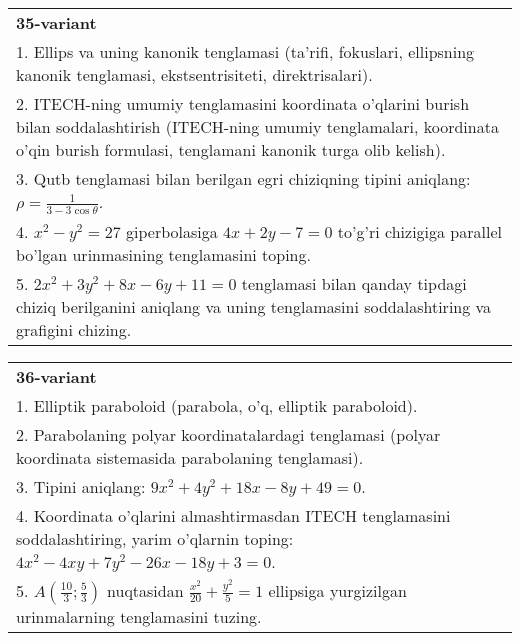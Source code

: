 \documentclass{article}
\begin{document}
\begin{tabular}{m{17cm}}
\textbf{35-variant}\\
1. Ellips va uning kanonik tenglamasi (ta'rifi, fokuslari, ellipsning kanonik tenglamasi, ekstsentrisiteti, direktrisalari).\\

2. ITECH-ning umumiy tenglamasini koordinata o'qlarini burish bilan soddalashtirish (ITECH-ning umumiy tenglamalari, koordinata o'qin burish formulasi, tenglamani kanonik turga olib kelish).\\

3. Qutb tenglamasi bilan berilgan egri chiziqning tipini aniqlang: $\rho=\frac{1}{3-3\cos\theta}$.\\

4. $x^{2} - y^{2} = 27$ giperbolasiga $4x + 2y - 7 = 0$ to'g'ri chizigiga parallel bo'lgan urinmasining tenglamasini toping.  \\

5. $2x^{2} + 3y^{2} + 8x - 6y + 11 = 0$ tenglamasi bilan qanday tipdagi chiziq berilganini aniqlang va uning tenglamasini soddalashtiring va grafigini chizing.  
\end{tabular}
\vspace{1cm}


\begin{tabular}{m{17cm}}
\textbf{36-variant}\\
1. Elliptik paraboloid (parabola, o'q, elliptik paraboloid).\\

2. Parabolaning polyar koordinatalardagi tenglamasi (polyar koordinata sistemasida parabolaning tenglamasi).\\

3. Tipini aniqlang: $9x^{2}+4y^{2}+18x-8y+49=0$.\\

4. Koordinata o'qlarini almashtirmasdan ITECH tenglamasini soddalashtiring, yarim o'qlarnin toping: $4x^{2} - 4xy + 7y^{2} - 26x - 18y + 3 = 0$.\\

5. $A(\frac{10}{3};\frac{5}{3})$ nuqtasidan $\frac{x^{2}}{20} + \frac{y^{2}}{5} = 1$ ellipsiga yurgizilgan urinmalarning tenglamasini tuzing.  
\end{tabular}
\vspace{1cm}
\end{document}
